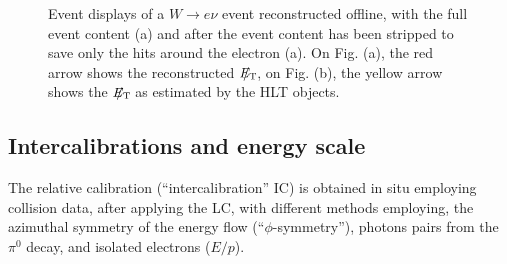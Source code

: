 \documentclass[journal]{IEEEtran}
\newcommand{\ETslash}{\ensuremath{E_{\mathrm{T}}\hspace{-1.1em}/\kern0.45em}}
\begin{document}
\begin{figure}[!t]
  \begin{center}
    \caption{Event displays of a $W\to e\nu$ event reconstructed offline, with the full event content (a) and after the event content has been stripped to save only the hits around the electron (a). On Fig. (a), the red arrow shows the reconstructed $\ETslash$, on Fig. (b), the yellow arrow shows the $\ETslash$ as estimated by the HLT objects. \label{fig:elestream}}
  \end{center}
\end{figure}
%


\subsection{Intercalibrations and energy scale}
\label{sec:intercalibrations}
The relative calibration (“intercalibration” IC) is obtained in situ employing collision data, after applying the LC, with different methods employing, the azimuthal symmetry of the energy flow (``$\phi$-symmetry''), photons pairs from the $\pi^0$ decay, and isolated electrons ($E/p$).
\end{document}
